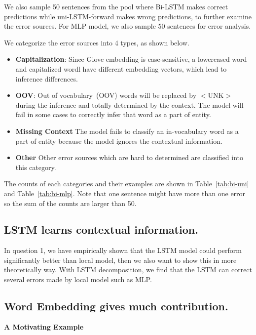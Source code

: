 \documentclass{article}
\begin{document}
We also sample 50 sentences from the pool where Bi-LSTM makes correct predictions while uni-LSTM-forward makes wrong predictions, to further examine the error sources. For MLP model, we also sample 50 sentences for error analysis.

We categorize the error sources into 4 types, as shown below.

\begin{itemize}
	\item \textbf{Capitalization}: Since Glove embedding is case-sensitive, a lowercased word and capitalized wordl have different embedding vectors, which lead to inference differences. 
	\item \textbf{OOV}: Out of vocabulary~(OOV) words will be replaced by $<$UNK$>$ during the inference and totally determined by the context. The model will fail in some cases to correctly infer that word as a part of entity.
	\item \textbf{Missing Context} The model fails to classify an in-vocabulary word as a part of entity because the model ignores the contextual information. 
	\item \textbf{Other} Other error sources which are hard to determined are classified into this category.
\end{itemize}

The counts of each categories and their examples are shown in Table~\ref{tab:bi-uni} and Table~\ref{tab:bi-mlp}. Note that one sentence might have more than one error so the sum of the counts are larger than 50.


\subsection{LSTM learns contextual information.}

In question 1, we have empirically shown that the LSTM model could perform significantly better than local model, then we also want to show this in more theoretically way. With LSTM decomposition, we find that the LSTM can correct several errors made by local model such as MLP. 



\subsection{Word Embedding gives much contribution.}

\noindent \textbf{A Motivating Example} 
\end{document}
